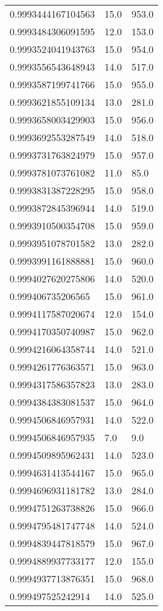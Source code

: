 \begin{center}
\begin{supertabular}[H]{p{0.30\textwidth}p{0.05\textwidth}p{0.05\textwidth}}
0.9993444167104563 & 15.0 & 953.0 \\ 
0.9993484306091595 & 12.0 & 153.0 \\ 
0.9993524041943763 & 15.0 & 954.0 \\ 
0.9993556543648943 & 14.0 & 517.0 \\ 
0.9993587199741766 & 15.0 & 955.0 \\ 
0.9993621855109134 & 13.0 & 281.0 \\ 
0.9993658003429903 & 15.0 & 956.0 \\ 
0.9993692553287549 & 14.0 & 518.0 \\ 
0.9993731763824979 & 15.0 & 957.0 \\ 
0.9993781073761082 & 11.0 & 85.0 \\ 
0.9993831387228295 & 15.0 & 958.0 \\ 
0.9993872845396944 & 14.0 & 519.0 \\ 
0.9993910500354708 & 15.0 & 959.0 \\ 
0.9993951078701582 & 13.0 & 282.0 \\ 
0.9993991161888881 & 15.0 & 960.0 \\ 
0.9994027620275806 & 14.0 & 520.0 \\ 
0.999406735206565 & 15.0 & 961.0 \\ 
0.9994117587020674 & 12.0 & 154.0 \\ 
0.9994170350740987 & 15.0 & 962.0 \\ 
0.9994216064358744 & 14.0 & 521.0 \\ 
0.9994261776363571 & 15.0 & 963.0 \\ 
0.9994317586357823 & 13.0 & 283.0 \\ 
0.9994384383081537 & 15.0 & 964.0 \\ 
0.9994506846957931 & 14.0 & 522.0 \\ 
0.9994506846957935 & 7.0 & 9.0 \\ 
0.9994509895962431 & 14.0 & 523.0 \\ 
0.9994631413544167 & 15.0 & 965.0 \\ 
0.9994696931181782 & 13.0 & 284.0 \\ 
0.9994751263738826 & 15.0 & 966.0 \\ 
0.9994795481747748 & 14.0 & 524.0 \\ 
0.9994839447818579 & 15.0 & 967.0 \\ 
0.9994889937733177 & 12.0 & 155.0 \\ 
0.9994937713876351 & 15.0 & 968.0 \\ 
0.999497525242914 & 14.0 & 525.0 \\ 

\end{supertabular}
\end{center}
